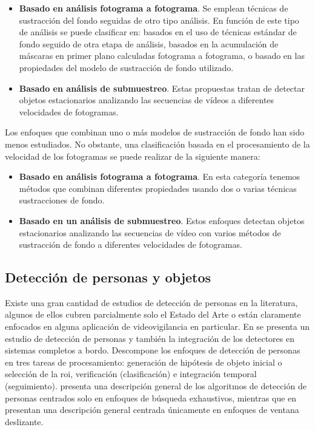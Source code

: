 \begin{itemize}
    \item \textbf{Basado en análisis fotograma a fotograma}. Se emplean técnicas de sustracción del fondo seguidas de otro tipo análisis. En función de este tipo de análisis se puede clasificar en: basados en el uso de técnicas estándar de fondo seguido de otra etapa de análisis, basados en la acumulación de máscaras en primer plano calculadas fotograma a fotograma, o basado en las propiedades del modelo de sustracción de fondo utilizado.
    \item \textbf{Basado en análisis de submuestreo}. Estas propuestas tratan de detectar objetos estacionarios analizando las secuencias de vídeos a diferentes velocidades de fotogramas. 
\end{itemize}

Los enfoques que combinan uno o más modelos de sustracción de fondo han sido menos estudiados. No obstante, una clasificación basada en el procesamiento de la velocidad de los fotogramas se puede realizar de la siguiente manera:

\begin{itemize}
    \item \textbf{Basado en análisis fotograma a fotograma}. En esta categoría tenemos métodos que combinan diferentes propiedades usando dos o varias técnicas sustracciones de fondo.
    \item \textbf{Basado en un análisis de submuestreo}. Estos enfoques detectan objetos estacionarios analizando las secuencias de vídeo con varios métodos de sustracción de fondo a diferentes velocidades de fotogramas.
\end{itemize}

\subsection{Detección de personas y objetos}
\label{subsec:tecnicas-deteccion-personas-objetos}

Existe una gran cantidad de estudios de detección de personas en la literatura, algunos de ellos cubren parcialmente solo el Estado del Arte o están claramente enfocados en alguna aplicación de videovigilancia en particular. En \cite{4657363} se presenta un estudio de detección de personas y también la integración de los detectores en sistemas completos a bordo. Descompone los enfoques de detección de personas en tres tareas de procesamiento: generación de hipótesis de objeto inicial o selección de la \gls{roi}, verificación (clasificación) e integración temporal (seguimiento). \cite{simonnet2012} presenta una descripción general de los algoritmos de detección de personas centrados solo en enfoques de búsqueda exhaustivos, mientras que en \cite{5975165} presentan una descripción general centrada únicamente en enfoques de ventana deslizante.

